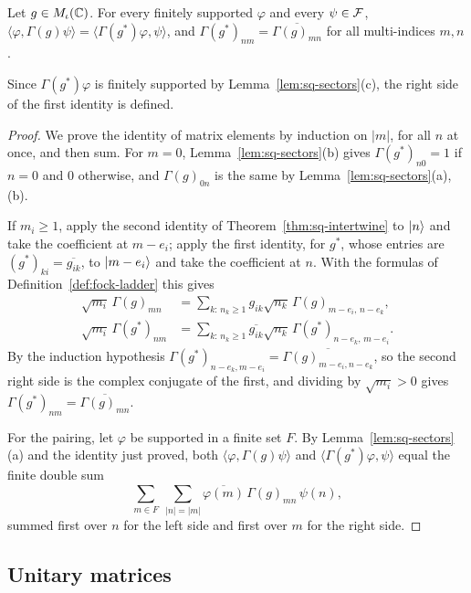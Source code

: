 \begin{vetdenv}
\begin{theorem}[Adjoint]\label{thm:sq-adjoint}
Let $g\in M_\iota(\mathbb C)$. For every finitely supported $\varphi$ and every $\psi\in\mathcal F$,
$\langle\varphi,\Gamma(g)\psi\rangle=\langle\Gamma(g^*)\varphi,\psi\rangle$, and $\Gamma(g^*)_{nm}=\overline{\Gamma(g)_{mn}}$
for all multi-indices $m,n$.
\end{theorem}

Since $\Gamma(g^*)\varphi$ is finitely supported by Lemma~\ref{lem:sq-sectors}(c), the right side of the first
identity is defined.

\begin{proof}
We prove the identity of matrix elements by induction on $\lvert m\rvert$, for all $n$ at once, and then sum.
For $m=0$, Lemma~\ref{lem:sq-sectors}(b) gives $\Gamma(g^*)_{n0}=1$ if $n=0$ and $0$ otherwise, and
$\Gamma(g)_{0n}$ is the same by Lemma~\ref{lem:sq-sectors}(a),(b).

If $m_i\ge1$, apply the second identity of Theorem~\ref{thm:sq-intertwine} to $\lvert n\rangle$ and take the coefficient at
$m-e_i$; apply the first identity, for $g^*$, whose entries are $(g^*)_{ki}=\overline{g_{ik}}$, to $\lvert m-e_i\rangle$ and
take the coefficient at $n$. With the formulas of Definition~\ref{def:fock-ladder} this gives
\begin{align*}
 \sqrt{m_i}\,\Gamma(g)_{mn}&=\sum_{k:\,n_k\ge1}g_{ik}\sqrt{n_k}\,\Gamma(g)_{m-e_i,\,n-e_k},\\
 \sqrt{m_i}\,\Gamma(g^*)_{nm}&=\sum_{k:\,n_k\ge1}\overline{g_{ik}}\sqrt{n_k}\,\Gamma(g^*)_{n-e_k,\,m-e_i}.
\end{align*}
By the induction hypothesis $\Gamma(g^*)_{n-e_k,m-e_i}=\overline{\Gamma(g)_{m-e_i,n-e_k}}$, so the second right side is
the complex conjugate of the first, and dividing by $\sqrt{m_i}>0$ gives $\Gamma(g^*)_{nm}=\overline{\Gamma(g)_{mn}}$.

For the pairing, let $\varphi$ be supported in a finite set $F$. By Lemma~\ref{lem:sq-sectors}(a) and the
identity just proved, both $\langle\varphi,\Gamma(g)\psi\rangle$ and $\langle\Gamma(g^*)\varphi,\psi\rangle$ equal the
finite double sum
\[
 \sum_{m\in F}\ \sum_{\lvert n\rvert=\lvert m\rvert}\overline{\varphi(m)}\,\Gamma(g)_{mn}\,\psi(n),
\]
summed first over $n$ for the left side and first over $m$ for the right side.
\end{proof}

\subsection{Unitary matrices}\label{sec:sq-unitary}


\end{vetdenv}

